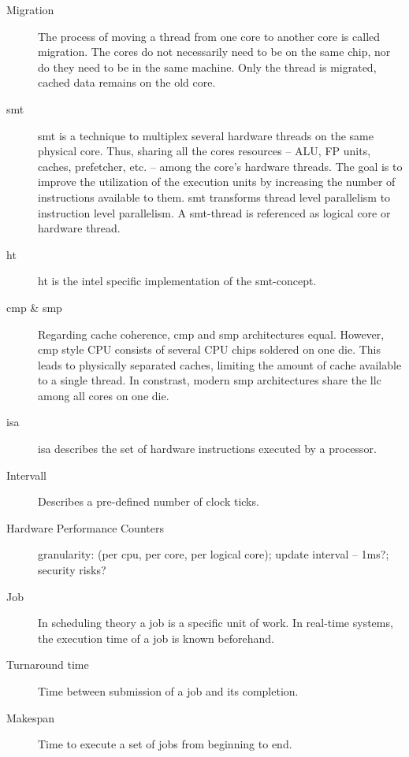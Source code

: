 \begin{description}
  \item[Migration] The process of moving a thread from one core to another core
    is called migration.
    The cores do not necessarily need to be on the same chip, nor do they need
    to be in the same machine. Only the thread is migrated, cached data remains
    on the old core.

  \item[\Gls{smt}] \gls{smt} is a technique to multiplex several hardware
    threads on the same physical core.
    Thus, sharing all the cores resources -- ALU, FP units, caches, prefetcher,
    etc. -- among the core's hardware threads.
    The goal is to improve the utilization of the execution units by increasing
    the number of instructions available to them.
    \gls{smt} transforms thread level parallelism to instruction level
    parallelism.
    A \gls{smt}-thread is referenced as logical core or hardware thread.

  \item[\Gls{ht}] \gls{ht} is the \gls{intel} specific implementation of the
    \gls{smt}-concept.

  \item[\Gls{cmp}  \& \Gls{smp}] Regarding cache coherence, \gls{cmp} and
    \gls{smp} architectures equal.
    However, \gls{cmp} style CPU consists of several CPU chips soldered on one
    die.
    This leads to physically separated caches, limiting the amount of cache
    available to a single thread.
    In constrast, modern \gls{smp} architectures share the \gls{llc} among all
    cores on one die.

  \item[\Gls{isa}]\gls{isa} describes the set of hardware instructions executed
    by a processor.

  \item[Intervall] Describes a pre-defined number of clock ticks.

  \item[Hardware Performance Counters]  granularity: (per
    cpu, per core, per logical core);
    update interval -- 1ms?;
    security risks?

  \item[Job] In scheduling theory a job is a specific unit of work.
    In real-time systems, the execution time of a job is known beforehand.

  \item[Turnaround time] Time between submission of a job and its completion.

  \item[Makespan] Time to execute a set of jobs from beginning to end.




\end{description}
